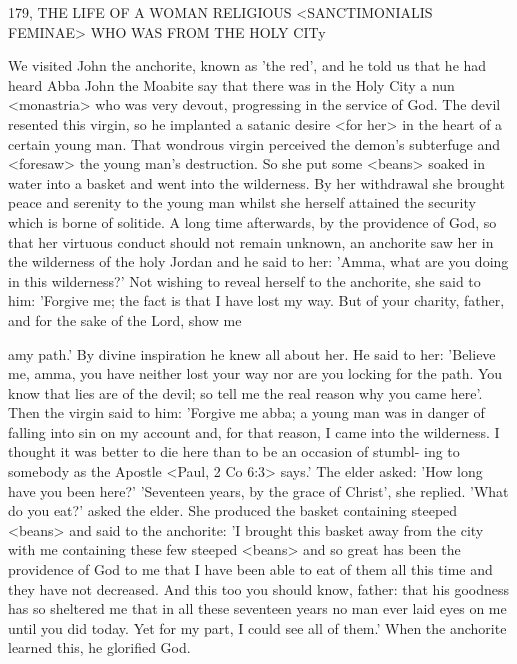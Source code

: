 179, THE LIFE OF A WOMAN RELIGIOUS
<SANCTIMONIALIS FEMINAE>
WHO WAS FROM THE HOLY CITy

We visited John the anchorite, known as 'the red', and he told us
that he had heard Abba John the Moabite say that there was in the
Holy City a nun <monastria> who was very devout, progressing in
the service of God.
The devil resented this virgin, so he implanted
a satanic desire <for her> in the heart of a certain young man.
That
wondrous virgin perceived the demon's subterfuge and <foresaw>
the young man's destruction.
So she put some <beans> soaked in
water into a basket and went into the wilderness.
By her withdrawal
she brought peace and serenity to the young man whilst she herself
attained the security which is borne of solitide.
A long time
afterwards, by the providence of God, so that her virtuous conduct
should not remain unknown, an anchorite saw her in the wilderness
of the holy Jordan and he said to her: 'Amma, what are you doing
in this wilderness?' Not wishing to reveal herself to the anchorite,
she said to him: 'Forgive me; the fact is that I have lost my way.
But of your charity, father, and for the sake of the Lord, show me

amy path.' By divine inspiration he knew all about her.
He said to
her: 'Believe me, amma, you have neither lost your way nor are you
locking for the path.
You know that lies are of the devil; so tell me
the real reason why you came here'.
Then the virgin said to him:
'Forgive me abba; a young man was in danger of falling into sin on
my account and, for that reason, I came into the wilderness.
I
thought it was better to die here than to be an occasion of stumbl-
ing to somebody as the Apostle <Paul, 2 Co 6:3> says.' The elder
asked: 'How long have you been here?' 'Seventeen years, by the
grace of Christ', she replied.
'What do you eat?' asked the elder.
She
produced the basket containing steeped <beans> and said to the
anchorite: 'I brought this basket away from the city with me
containing these few steeped <beans> and so great has been the
providence of God to me that I have been able to eat of them all
this time and they have not decreased.
And this too you should
know, father: that his goodness has so sheltered me that in all these
seventeen years no man ever laid eyes on me until you did today.
Yet for my part, I could see all of them.' When the anchorite
learned this, he glorified God.

